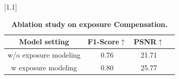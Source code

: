 \begin{table}%
\vspace{-0.2cm}
  \caption{\textbf{Ablation study on exposure Compensation.}}
  \label{tab:ablation_exposure}
  \scriptsize%
	\centering%
  \setlength{\tabcolsep}{5pt}
  \scalebox{1.1}[1.1]{
  \begin{tabu}{c|ccc}
  \toprule
     Model setting & F1-Score$\uparrow$ & PSNR$\uparrow$\\
  \midrule
  w/o exposure modeling & 0.76 & 21.71   \\
  w exposure modeling & 0.80 & 25.77  \\
  \bottomrule
  \end{tabu}%
  }
  \vspace{-0.2cm}
\end{table}
